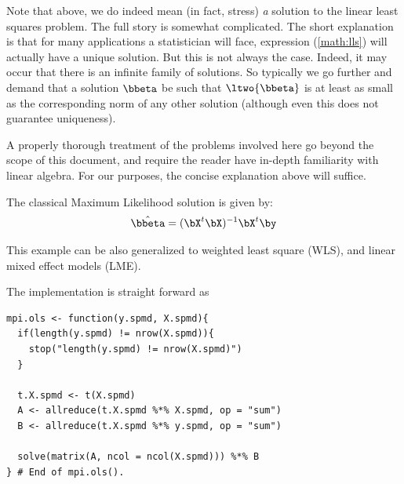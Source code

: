 Note that above, we do indeed mean (in fact, stress) \emph{a} solution to the linear least squares problem.  The full story is somewhat complicated.  The short explanation is that for many applications a statistician will face, expression (\ref{math:lls}) will actually have a unique solution.  But this is not always the case.  Indeed, it may occur that there is an infinite family of solutions.  So typically we go further and demand that a solution $\bbeta$ be such that $\ltwo{\bbeta}$ is at least as small as the corresponding norm of any other solution (although even this does not guarantee uniqueness).

A properly thorough treatment of the problems involved here go beyond the scope of this document, and require the reader have in-depth familiarity with linear algebra.  For our purposes, the concise explanation above will suffice.

The classical Maximum Likelihood solution is given by:
\begin{align}
 \hat{\bbeta} = (\bX^t\bX)^{-1}\bX^t\by \label{math:ols}
\end{align}
 
This example can be also generalized to weighted least square (WLS),
and linear mixed effect models (LME).

The implementation is straight forward as
\begin{lstlisting}[language=rr,title=R Code]
mpi.ols <- function(y.spmd, X.spmd){
  if(length(y.spmd) != nrow(X.spmd)){
    stop("length(y.spmd) != nrow(X.spmd)")
  }

  t.X.spmd <- t(X.spmd)
  A <- allreduce(t.X.spmd %*% X.spmd, op = "sum")
  B <- allreduce(t.X.spmd %*% y.spmd, op = "sum")

  solve(matrix(A, ncol = ncol(X.spmd))) %*% B
} # End of mpi.ols().

\end{lstlisting}

